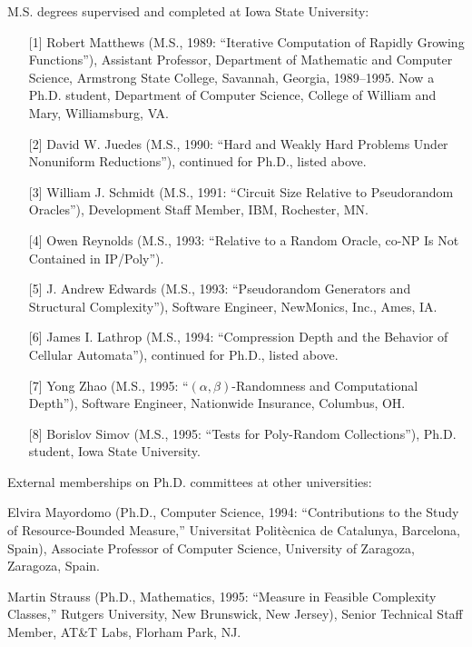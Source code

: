 \vspace*{\smallskipamount}
M.S. degrees supervised and completed at Iowa State University:

\begin{enumerate}
\item[{[1]}]
Robert Matthews (M.S., 1989:  ``Iterative Computation of Rapidly
Growing Functions''), Assistant Professor, Department of Mathematic
and Computer Science, Armstrong State College, Savannah, Georgia,
1989--1995.  Now a Ph.D. student, Department of Computer Science,
College of William and Mary, Williamsburg, VA.
\item[{[2]}]
David W. Juedes (M.S., 1990: ``Hard and Weakly Hard Problems Under
Nonuniform Reductions''), continued for Ph.D., listed above.
\item[{[3]}]
William J. Schmidt (M.S., 1991: ``Circuit Size Relative to
Pseudorandom Oracles''), Development Staff Member, IBM, Rochester, MN.
\item[{[4]}]
Owen Reynolds (M.S., 1993: ``Relative to a Random Oracle, co-NP
Is Not Contained in IP/Poly'').
\item[{[5]}]
J. Andrew Edwards (M.S., 1993: ``Pseudorandom Generators and
Structural Complexity''), Software Engineer, NewMonics, Inc.,
Ames, IA.
\item[{[6]}]
James I. Lathrop (M.S., 1994: ``Compression Depth and the Behavior of
Cellular Automata''), continued for Ph.D., listed above.
\item[{[7]}]
Yong Zhao (M.S., 1995: ``$(\alpha, \beta)$-Randomness and Computational 
Depth''), Software Engineer, Nationwide Insurance, Columbus, OH.
\item[{[8]}]
Borislov Simov (M.S., 1995: ``Tests for Poly-Random
Collections''), Ph.D. student, Iowa State University.
\end{enumerate}

\vspace*{\smallskipamount}
External memberships on Ph.D. committees at other universities:

\hangindent=0.3in
\vspace*{\medskipamount}
Elvira Mayordomo (Ph.D., Computer Science, 1994: ``Contributions
to the Study of Resource-Bounded Measure,'' Universitat
Polit\`{e}cnica de Catalunya, Barcelona, Spain), Associate
Professor of Computer Science, University of Zaragoza,
Zaragoza, Spain.

\hangindent=0.3in
\vspace*{\medskipamount}
Martin Strauss (Ph.D., Mathematics, 1995: ``Measure in Feasible
Complexity Classes,'' Rutgers University, New Brunswick, New 
Jersey), Senior Technical Staff Member, AT\&T Labs, Florham
Park, NJ.

